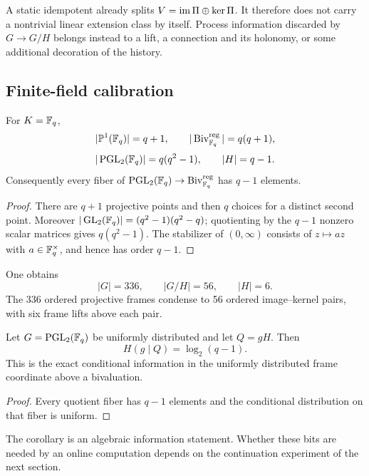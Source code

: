 A static idempotent already splits $V=\operatorname{im}\Pi\oplus\ker\Pi$.  It therefore does
not carry a nontrivial linear extension class by itself.  Process information
discarded by $G\to G/H$ belongs instead to a lift, a connection and its
holonomy, or some additional decoration of the history.

\subsection{Finite-field calibration}

\begin{proposition}
\label{prop:finite-field-counts}
For $K=\mathbb{F}_q$,
\[
  |\mathbb{P}^1(\mathbb{F}_q)|=q+1,
  \qquad
  |\operatorname{Biv}_{\mathbb{F}_q}^{\mathrm{reg}}|=q(q+1),
\]
\[
  |\operatorname{PGL}_2(\mathbb{F}_q)|=q(q^2-1),
  \qquad
  |H|=q-1.
\]
Consequently every fiber of
$\operatorname{PGL}_2(\mathbb{F}_q)\to\operatorname{Biv}_{\mathbb{F}_q}^{\mathrm{reg}}$ has $q-1$ elements.
\end{proposition}

\begin{proof}
There are $q+1$ projective points and then $q$ choices for a distinct second
point.  Moreover
$|\operatorname{GL}_2(\mathbb{F}_q)|=(q^2-1)(q^2-q)$; quotienting by the $q-1$ nonzero scalar
matrices gives $q(q^2-1)$.  The stabilizer of $(0,\infty)$ consists of
$z\mapsto az$ with $a\in\mathbb{F}_q^\times$, and hence has order $q-1$.
\end{proof}

\begin{example}
\label{ex:f7-counts}
One obtains
\[
  |G|=336,
  \qquad |G/H|=56,
  \qquad |H|=6.
\]
The 336 ordered projective frames condense to 56 ordered image--kernel pairs,
with six frame lifts above each pair.
\end{example}

\begin{corollary}
\label{cor:finite-frame-entropy}
Let $G=\operatorname{PGL}_2(\mathbb{F}_q)$ be uniformly distributed and let $Q=gH$.  Then
\[
  H(g\mid Q)=\log_2(q-1).
\]
This is the exact conditional information in the uniformly distributed frame
coordinate above a bivaluation.
\end{corollary}

\begin{proof}
Every quotient fiber has $q-1$ elements and the conditional distribution on
that fiber is uniform.
\end{proof}

The corollary is an algebraic information statement.  Whether these bits are
needed by an online computation depends on the continuation experiment of the
next section.

